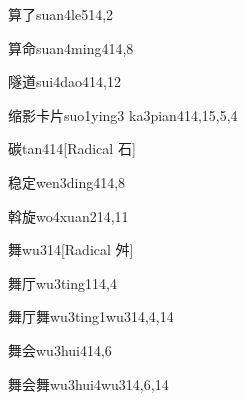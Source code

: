 \begin{verbete}{算了}{suan4le5}{14,2}
\end{verbete}

\begin{verbete}{算命}{suan4ming4}{14,8}
\end{verbete}

\begin{verbete}{隧道}{sui4dao4}{14,12}
\end{verbete}

\begin{verbete}{缩影卡片}{suo1ying3 ka3pian4}{14,15,5,4}
\end{verbete}

\begin{verbete}{碳}{tan4}{14}[Radical 石]
\end{verbete}

\begin{verbete}{稳定}{wen3ding4}{14,8}
\end{verbete}

\begin{verbete}{斡旋}{wo4xuan2}{14,11}
\end{verbete}

\begin{verbete}{舞}{wu3}{14}[Radical 舛]
\end{verbete}

\begin{verbete}{舞厅}{wu3ting1}{14,4}
\end{verbete}

\begin{verbete}{舞厅舞}{wu3ting1wu3}{14,4,14}
\end{verbete}

\begin{verbete}{舞会}{wu3hui4}{14,6}
\end{verbete}

\begin{verbete}{舞会舞}{wu3hui4wu3}{14,6,14}
\end{verbete}

